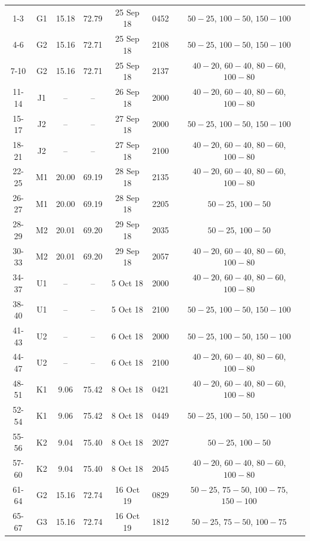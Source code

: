 \documentclass[authoryear,review,11pt]{elsarticle}
\begin{document}
\begin{scriptsize}
\begin{longtable}{ccccccc}
		
		1-3   & G1  & 15.18   & 72.79   & 25 Sep 18  & 0452  & $50-25$, $100-50$, $150-100$ \\
		4-6   & G2  & 15.16   & 72.71   & 25 Sep 18  & 2108  & $50-25$, $100-50$, $150-100$ \\
		7-10  & G2  & 15.16   & 72.71   & 25 Sep 18  & 2137  & $40-20$, $60-40$, $80-60$, $100-80$ \\
		11-14 & J1  & --      & --      & 26 Sep 18  & 2000  & $40-20$, $60-40$, $80-60$, $100-80$ \\
		15-17 & J2  & --      & --      & 27 Sep 18  & 2000  & $50-25$, $100-50$, $150-100$ \\
		18-21 & J2  & --      & --      & 27 Sep 18  & 2100  & $40-20$, $60-40$, $80-60$, $100-80$ \\
		22-25 & M1  & 20.00   & 69.19   & 28 Sep 18  & 2135  & $40-20$, $60-40$, $80-60$, $100-80$ \\
		26-27 & M1  & 20.00   & 69.19   & 28 Sep 18  & 2205  & $50-25$, $100-50$ \\
		28-29 & M2  & 20.01   & 69.20   & 29 Sep 18  & 2035  & $50-25$, $100-50$ \\
		30-33 & M2  & 20.01   & 69.20   & 29 Sep 18  & 2057  & $40-20$, $60-40$, $80-60$, $100-80$ \\
		34-37 & U1  & --      & --      & 5 Oct 18   & 2000  & $40-20$, $60-40$, $80-60$, $100-80$ \\
		38-40 & U1  & --      & --      & 5 Oct 18   & 2100  & $50-25$, $100-50$, $150-100$ \\
		41-43 & U2  & --      & --      & 6 Oct 18   & 2000  & $50-25$, $100-50$, $150-100$ \\
		44-47 & U2  & --      & --      & 6 Oct 18   & 2100  & $40-20$, $60-40$, $80-60$, $100-80$ \\
		48-51 & K1  & 9.06    & 75.42   & 8 Oct 18   & 0421  & $40-20$, $60-40$, $80-60$, $100-80$ \\
		52-54 & K1  & 9.06    & 75.42   & 8 Oct 18   & 0449  & $50-25$, $100-50$, $150-100$ \\
		55-56 & K2  & 9.04    & 75.40   & 8 Oct 18   & 2027  & $50-25$, $100-50$ \\
		57-60 & K2  & 9.04    & 75.40   & 8 Oct 18   & 2045  & $40-20$, $60-40$, $80-60$, $100-80$ \\
		\midrule
		61-64 & G2  & 15.16   & 72.74   & 16 Oct 19  & 0829  & $50-25$, $75-50$, $100-75$, $150-100$ \\
		65-67 & G3  & 15.16   & 72.74   & 16 Oct 19  & 1812  & $50-25$, $75-50$, $100-75$ \\

\end{longtable}
\end{scriptsize}
\end{document}
